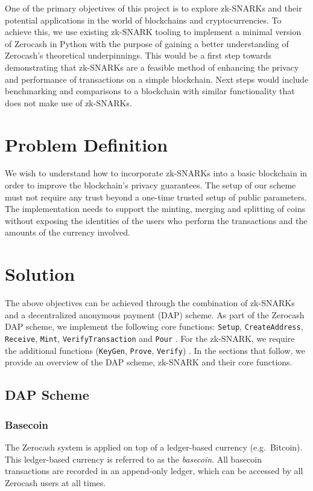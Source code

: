 \documentclass{article}
\begin{document}
One of the primary objectives of this project is to explore zk-SNARKs and their potential applications in the world of blockchains and cryptocurrencies. To achieve this, we use existing zk-SNARK tooling to implement a minimal version of Zerocash in Python with the purpose of gaining a better understanding of Zerocash's theoretical underpinnings. This would be a first step towards demonstrating that zk-SNARKs are a feasible method of enhancing the privacy and performance of transactions on a simple blockchain. Next steps would include benchmarking and comparisons to a blockchain with similar functionality that does not make use of zk-SNARKs.

\section{Problem Definition}
We wish to understand how to incorporate zk-SNARKs into a basic blockchain in order to improve the blockchain's privacy guarantees. The setup of our scheme must not require any trust beyond a one-time trusted setup of public parameters. The implementation needs to support the minting, merging and splitting of coins without exposing the identities of the users who perform the transactions and the amounts of the currency involved.

\section{Solution}
The above objectives can be achieved through the combination of zk-SNARKs and a decentralized anonymous payment (DAP) scheme. As part of the Zerocash DAP scheme, we implement the following core functions: \texttt{Setup}, \texttt{CreateAddress}, \texttt{Receive}, \texttt{Mint}, \texttt{VerifyTransaction} and \texttt{Pour} \cite{zerocash}. For the zk-SNARK, we require the additional functions (\texttt{KeyGen}, \texttt{Prove}, \texttt{Verify}) \cite{zerocash}. In the sections that follow, we provide an overview of the DAP scheme, zk-SNARK and their core functions.

\subsection{DAP Scheme}
\subsubsection{Basecoin}
The Zerocash system is applied on top of a ledger-based currency (e.g.\ Bitcoin). This ledger-based currency is referred to as the \emph{basecoin}. All basecoin transactions are recorded in an append-only ledger, which can be accessed by all Zerocash users at all times.
\end{document}
